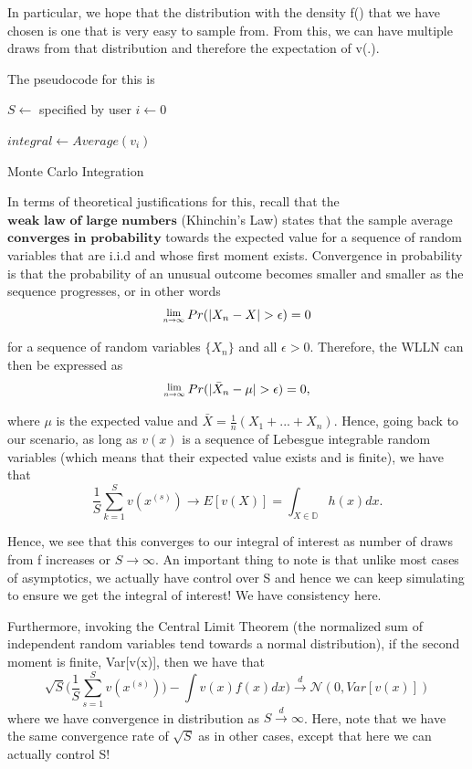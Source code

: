 \documentclass[twoside]{article}
\newcommand{\Lim}[1]{\raisebox{0.5ex}{\scalebox{0.8}{$\displaystyle \lim_{#1}\;$}}}
\begin{document}
In particular, we hope that the distribution with the density f() that we have chosen is one that is very easy to sample from. From this, we can have multiple draws from that distribution and therefore the expectation of v(.). 

The pseudocode for this is

\begin{algorithm}
\DontPrintSemicolon
{}
$S \gets$ specified by user\;
$i \gets 0$\;

$integral \gets Average(v_i)$

\;
\caption{{\sc Monte Carlo Integration}}
\label{algo:duplicate}
\end{algorithm}

In terms of theoretical justifications for this, recall that the $\textbf{weak law of large numbers}$ (Khinchin's Law) states that the sample average $\textbf{converges in probability}$ towards the expected value for a sequence of random variables that are i.i.d and whose first moment exists. Convergence in probability is that the probability of an unusual outcome becomes smaller and smaller as the sequence progresses, or in other words
$$
\Lim{n \rightarrow \infty}Pr(|X_n - X| > \epsilon) = 0
$$

for a sequence of random variables $\{X_n\}$ and all $\epsilon > 0$. Therefore, the WLLN can then be expressed as
$$
\Lim{n \rightarrow \infty}Pr(|\bar{X}_n - \mu| > \epsilon) = 0,
$$

where $\mu$ is the expected value and $\bar{X} = \frac{1}{n}(X_1 + ... + X_n)$. Hence, going back to our scenario, as long as $v(x)$ is a sequence of Lebesgue integrable random variables (which means that their expected value exists and is finite), we have that
$$
\frac{1}{S}\sum_{k=1}^Sv(x^{(s)}) \rightarrow E[v(X)] = \int_{X \in \mathbb{D}}h(x)dx.
$$

Hence, we see that this converges to our integral of interest as number of draws from f increases or $S \rightarrow \infty$. An important thing to note is that unlike most cases of asymptotics, we actually have control over S and hence we can keep simulating to ensure we get the integral of interest! We have consistency here. 

Furthermore, invoking the Central Limit Theorem (the normalized sum of independent random variables tend towards a normal distribution), if the second moment is finite, Var[v(x)], then we have that
$$
\sqrt{S}\big(\frac{1}{S}\sum_{s=1}^Sv(x^{(s)})\big) - \int v(x)f(x)dx) \xrightarrow{d} \mathcal{N}(0, Var[v(x)])
$$
where we have convergence in distribution as $S \xrightarrow{d} \infty$. Here, note that we have the same convergence rate of $\sqrt{S}$ as in other cases, except that here we can actually control S! 
\end{document}
